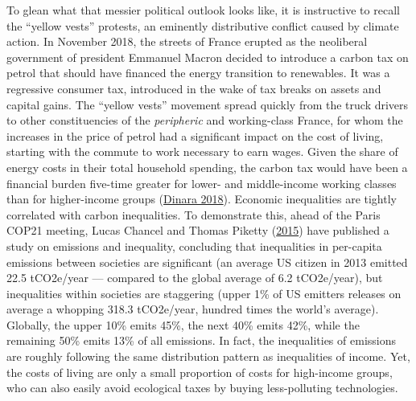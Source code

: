 \documentclass[a4paper, nobind]{templates/ociamthesis}
\begin{document}
To glean what that messier political outlook looks like, it is instructive to recall the ``yellow vests'' protests, an eminently distributive conflict caused by climate action. In November 2018, the streets of France erupted as the neoliberal government of president Emmanuel Macron decided to introduce a carbon tax on petrol that should have financed the energy transition to renewables. It was a regressive consumer tax, introduced in the wake of tax breaks on assets and capital gains. The ``yellow vests'' movement spread quickly from the truck drivers to other constituencies of the \emph{peripheric} and working-class France, for whom the increases in the price of petrol had a significant impact on the cost of living, starting with the commute to work necessary to earn wages. Given the share of energy costs in their total household spending, the carbon tax would have been a financial burden five-time greater for lower- and middle-income working classes than for higher-income groups (\protect\hyperlink{ref-dinara_were_2018}{Dinara 2018}). Economic inequalities are tightly correlated with carbon inequalities. To demonstrate this, ahead of the Paris COP21 meeting, Lucas Chancel and Thomas Piketty (\protect\hyperlink{ref-piketty_carbon_2015}{2015}) have published a study on emissions and inequality, concluding that inequalities in per-capita emissions between societies are significant (an average US citizen in 2013 emitted 22.5 tCO2e/year --- compared to the global average of 6.2 tCO2e/year), but inequalities within societies are staggering (upper 1\% of US emitters releases on average a whopping 318.3 tCO2e/year, hundred times the world's average). Globally, the upper 10\% emits 45\%, the next 40\% emits 42\%, while the remaining 50\% emits 13\% of all emissions. In fact, the inequalities of emissions are roughly following the same distribution pattern as inequalities of income. Yet, the costs of living are only a small proportion of costs for high-income groups, who can also easily avoid ecological taxes by buying less-polluting technologies.
\end{document}
